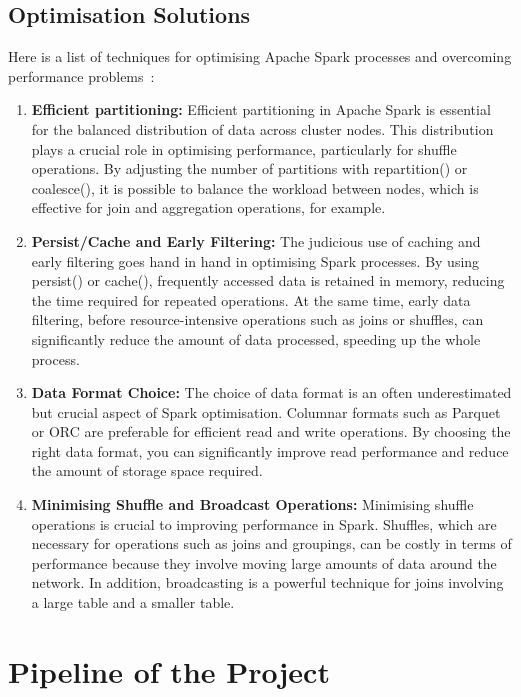 \documentclass[12pt,oneside]{book} %
\begin{document}
\subsection{Optimisation Solutions}
Here is a list of techniques for optimising Apache Spark processes and
overcoming performance problems~\cite{NNK2023}:
\begin{enumerate}
    \itemindent=17.87pt
    \item \textbf{Efficient partitioning:} Efficient partitioning in Apache Spark is essential for the balanced distribution of data across cluster nodes. This distribution plays a crucial role in optimising performance, particularly for shuffle operations. By adjusting the number of partitions with repartition() or coalesce(), it is possible to balance the workload between nodes, which is effective for join and aggregation operations, for example.
    \item \textbf{Persist/Cache and Early Filtering:} The judicious use of caching and early filtering goes hand in hand in optimising Spark processes. By using persist() or cache(), frequently accessed data is retained in memory, reducing the time required for repeated operations. At the same time, early data filtering, before resource-intensive operations such as joins or shuffles, can significantly reduce the amount of data processed, speeding up the whole process.
    \item \textbf{Data Format Choice:} The choice of data format is an often underestimated but crucial aspect of Spark optimisation. Columnar formats such as Parquet or ORC are preferable for efficient read and write operations. By choosing the right data format, you can significantly improve read performance and reduce the amount of storage space required.
    \item \textbf{Minimising Shuffle and Broadcast Operations:} Minimising shuffle operations is crucial to improving performance in Spark. Shuffles, which are necessary for operations such as joins and groupings, can be costly in terms of performance because they involve moving large amounts of data around the network. In addition, broadcasting is a powerful technique for joins involving a large table and a smaller table.
\end{enumerate}

\newpage

\section{Pipeline of the Project}
\end{document}
